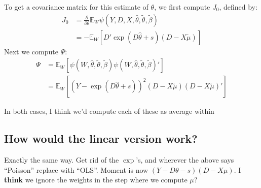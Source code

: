 \documentclass[11pt]{article}
\begin{document}
To get a covariance matrix for this estimate of $\theta$, we first compute $J_0$, defined by:
\begin{align*}
	J_0 &= \frac{\partial}{\partial \theta} \mathbb{E}_W \psi(Y,D,X,\widehat{\theta},\widetilde{\theta}, \widetilde{\beta}) \\
	&= -\mathbb{E}_W\left[D'\exp(D\widehat{\theta} + s)(D - X\widetilde{\mu}) \right]
\end{align*}
Next we compute $\Psi$:
\begin{align*}
	\Psi &= \mathbb{E}_W\left[\psi(W, \widehat{\theta},\widetilde{\theta}, \widetilde{\beta})\psi(W, \widehat{\theta},\widetilde{\theta}, \widetilde{\beta})'\right] \\
		&= \mathbb{E}_W\left[(Y - \exp(D\widehat{\theta} + s))^2(D - X\widetilde{\mu})(D - X\widetilde{\mu})'\right]
\end{align*}

In both cases, I think we'd compute each of these as average within 

\subsection{How would the linear version work?}
Exactly the same way.  Get rid of the $\exp$'s, and wherever the above says ``Poisson'' replace with ``OLS''.  Moment is now $(Y - D\theta - s)(D - X\mu)$.  I \textbf{think} we ignore the weights in the step where we compute $\mu$?
\end{document}
